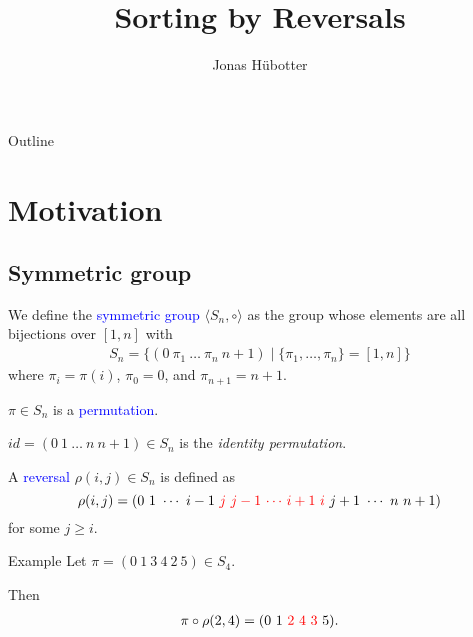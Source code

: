 \documentclass{beamer}
\title[Sorting by Reversals]{Sorting by Reversals}
\author{Jonas Hübotter}
\theoremstyle{definition}
\def\spadding{\vspace{0.25cm}}
\def\b{\textcolor{blue}}
\def\r{\textcolor{red}}
\begin{document}
\begin{frame}
  \titlepage
\end{frame}

\begin{frame}{Outline}
 \tableofcontents
\end{frame}

\section{Motivation}

\subsection{Symmetric group}

\begin{frame}

\begin{definition}
We define the \b{symmetric group} $\langle S_n, \circ \rangle$ as the group whose elements are all bijections over $[1,n]$ \pause with
\begin{align*}
    S_n = \{(0\ \pi_1\ \dots\ \pi_n\ n+1) \mid \{\pi_1, \dots, \pi_n\} = [1,n]\}
\end{align*}
where $\pi_i = \pi(i)$, $\pi_0 = 0$, and $\pi_{n+1} = n+1$.\pause\spadding

$\pi \in S_n$ is a \b{permutation}.\pause\spadding

$id = (0\ 1\ \dots\ n\ n+1) \in S_n$ is the \textit{identity permutation}.
\end{definition}

\end{frame}

\begin{frame}

\begin{definition}
A \b{reversal} $\rho(i,j) \in S_n$ is defined as
\[
    \rho(i,j) = (0\ 1\ \cdots\ i-1\ \r j\ \r{j-1}\ \r \cdots\ \r{i+1}\ \r i\ j+1\ \cdots\ n\ n+1)
\]
for some $j \geq i$.
\end{definition}\pause

\begin{exampleblock}{Example}
Let $\pi = (0\ 1\ 3\ 4\ 2\ 5) \in S_4$. \par
Then
\begin{align*}
    \pi \circ \rho(2,4) = (0\ 1\ \r{2\ 4\ 3}\ 5).
\end{align*}
\end{exampleblock}

\end{frame}
\end{document}
